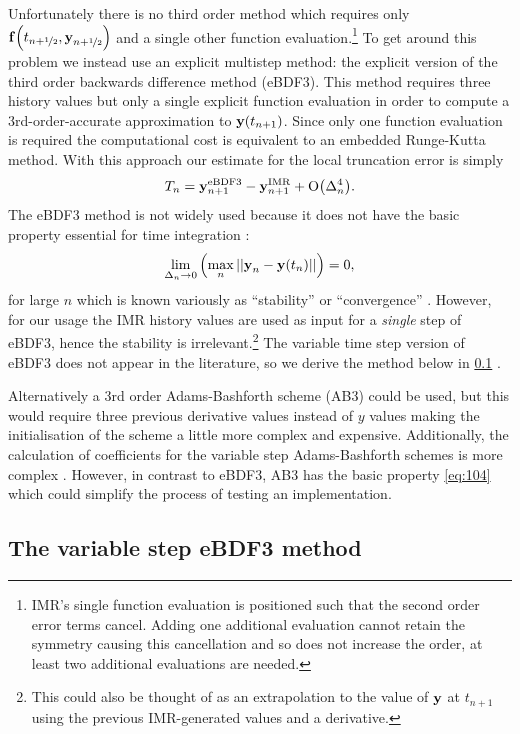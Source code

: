 Unfortunately there is no third order method which requires only ${\boldsymbol{\mathrm{f}}{\left( t_{n+\nicefrac{1}{2}}, \boldsymbol{\mathrm{y}}_{n+\nicefrac{1}{2}} \right)}}$ and a single other function evaluation.\footnote{IMR's single function evaluation is positioned such that the second order error terms cancel. Adding one additional evaluation cannot retain the symmetry causing this cancellation and so does not increase the order, at least two additional evaluations are needed.}
To get around this problem we instead use an explicit multistep method: the explicit version of the third order backwards difference method (eBDF3).
This method requires three history values but only a single explicit function evaluation in order to compute a 3rd-order-accurate approximation to $\boldsymbol{\mathrm{y}}(t_{n+1})$.
Since only one function evaluation is required the computational cost is equivalent to an embedded Runge-Kutta method.
With this approach our estimate for the local truncation error is simply
\begin{equation}
  \label{eq:aimr-lte-est}
  T_n = \boldsymbol{\mathrm{y}}_{n+1}^{\mathrm{eBDF3}} - \boldsymbol{\mathrm{y}}_{n+1}^{\mathrm{IMR}} + \mathrm{O}{\left( \Delta_{n}^4 \right)}.
\end{equation}
The eBDF3 method is not widely used because it does not have the basic property essential for time integration \cite[365]{HairerNorsettWanner}:
\begin{equation}
  \lim_{\Delta_{n} \rightarrow 0} {\left(  \max_n \left| \left| \boldsymbol{\mathrm{y}}_{n} - \boldsymbol{\mathrm{y}}(t_n) \right| \right| \right)} = 0,
  \label{eq:104}
\end{equation}
for large $n$ which is known variously as ``stability'' \cite[378]{HairerNorsettWanner} or ``convergence'' \cite[6]{Iserles2009}.
However, for our usage the IMR history values are used as input for a \emph{single} step of eBDF3, hence the stability is irrelevant.\footnote{This could also be thought of as an extrapolation to the value of $\boldsymbol{\mathrm{y}}$ at $t_{n+1}$ using the previous IMR-generated values and a derivative.}
The variable time step version of eBDF3 does not appear in the literature, so we derive the method below in \cref{sec:variable-step-ebdf3} .

Alternatively a 3rd order Adams-Bashforth scheme (AB3) could be used, but this would require three previous derivative values instead of $y$ values making the initialisation of the scheme a little more complex and expensive.
Additionally, the calculation of coefficients for the variable step Adams-Bashforth schemes is more complex \cite[400]{HairerNorsettWanner}.
However, in contrast to eBDF3, AB3 has the basic property \cref{eq:104} which could simplify the process of testing an implementation.


\subsection{The variable step eBDF3 method}
\label{sec:variable-step-ebdf3}

